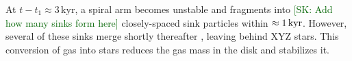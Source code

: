 \documentclass[twocolumn]{openjournal}
\newcommand{\kyr}{\,\mathrm{kyr}}
\newcommand{\tform}{t_1}
\newcommand{\skcomment}[1]{{\textcolor{darkgreen}{[SK: #1]}}}
\newcommand{\skadd}[1]{{\textcolor{orange(ryb)}{#1}}}
\begin{document}

\skadd{At $t - \tform \approx 3\kyr$, a spiral arm becomes unstable and fragments into} \skcomment{Add how many sinks form here} \skadd{closely-spaced sink particles within $\approx1\, \rm kyr$. However, several of these sinks merge shortly thereafter \citep[see][for details on the merging criteria]{STARFORGE_Towa_Grudic_2021}, leaving behind XYZ stars. This conversion of gas into stars reduces the gas mass in the disk and stabilizes it.}
\end{document}

